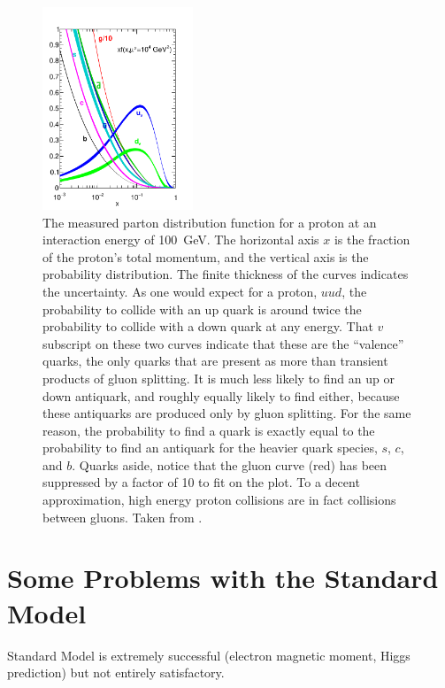   \begin{figure}[h!]
    \centering
    \includegraphics[width=0.4\textwidth]{figures/parton_distribution_function.pdf}
    \caption[Proton parton distribution function.]{
      The measured parton distribution function for a proton at an interaction energy of 100~GeV.
      The horizontal axis $x$ is the fraction of the proton's total momentum, and the vertical axis is the probability distribution.
      The finite thickness of the curves indicates the uncertainty.
      As one would expect for a proton, $uud$, the probability to collide with an up quark is around twice the probability to collide with a down quark at any energy.
      That $v$ subscript on these two curves indicate that these are the ``valence'' quarks, the only quarks that are present as more than transient products of gluon splitting.
      It is much less likely to find an up or down antiquark, and roughly equally likely to find either, because these antiquarks are produced only by gluon splitting.
      For the same reason, the probability to find a quark is exactly equal to the probability to find an antiquark for the heavier quark species, $s$, $c$, and $b$.
      Quarks aside, notice that the gluon curve (red) has been suppressed by a factor of 10 to fit on the plot.
      To a decent approximation, high energy proton collisions are in fact collisions between gluons.
      Taken from \cite{PDFs}.}
    \label{fig:PDF}
  \end{figure}  


\section{Some Problems with the Standard Model} \label{sec:SMproblems}

Standard Model is extremely successful (electron magnetic moment, Higgs prediction) but not entirely satisfactory.


